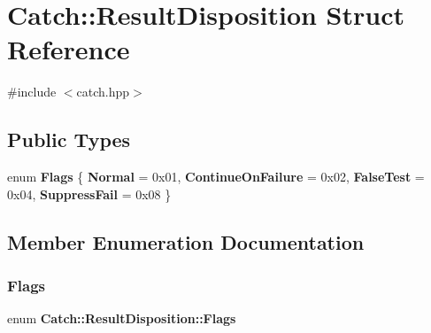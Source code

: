 \section{Catch\+:\+:Result\+Disposition Struct Reference}
\label{struct_catch_1_1_result_disposition}


{\ttfamily \#include $<$catch.\+hpp$>$}

\subsection*{Public Types}
\begin{DoxyCompactItemize}
\item 
enum \textbf{ Flags} \{ \textbf{ Normal} = 0x01, 
\textbf{ Continue\+On\+Failure} = 0x02, 
\textbf{ False\+Test} = 0x04, 
\textbf{ Suppress\+Fail} = 0x08
 \}
\end{DoxyCompactItemize}


\subsection{Member Enumeration Documentation}
\mbox{\label{struct_catch_1_1_result_disposition_a3396cad6e2259af326b3aae93e23e9d8}} 
\subsubsection{Flags}
{\footnotesize\ttfamily enum \textbf{ Catch\+::\+Result\+Disposition\+::\+Flags}}

